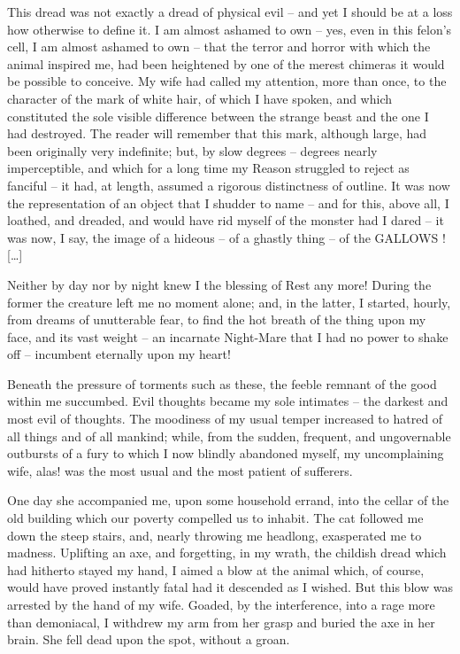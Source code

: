 \documentclass[11pt,a4paper]{article}
\begin{document}
This dread was not exactly a dread of physical evil -- and yet I should be at a loss how otherwise to define it. I am almost ashamed to own -- yes, even in this felon's cell, I am almost ashamed to own -- that the terror and horror with which the animal inspired me, had been heightened by one of the merest chimeras it would be possible to conceive. My wife had called my attention, more than once, to the character of the mark of white hair, of which I have spoken, and which constituted the sole visible difference between the strange beast and the one I had destroyed. The reader will remember that this mark, although large, had been originally very indefinite; but, by slow degrees -- degrees nearly imperceptible, and which for a long time my Reason struggled to reject as fanciful -- it had, at length, assumed a rigorous distinctness of outline. It was now the representation of an object that I shudder to name -- and for this, above all, I loathed, and dreaded, and would have rid myself of the monster had I dared -- it was now, I say, the image of a hideous -- of a ghastly thing -- of the GALLOWS ! […]

Neither by day nor by night knew I the blessing of Rest any more! During the former the creature left me no moment alone; and, in the latter, I started, hourly, from dreams of unutterable fear, to find the hot breath of the thing upon my face, and its vast weight -- an incarnate Night-Mare that I had no power to shake off -- incumbent eternally upon my heart!

Beneath the pressure of torments such as these, the feeble remnant of the good within me succumbed. Evil thoughts became my sole intimates -- the darkest and most evil of thoughts. The moodiness of my usual temper increased to hatred of all things and of all mankind; while, from the sudden, frequent, and ungovernable outbursts of a fury to which I now blindly abandoned myself, my uncomplaining wife, alas! was the most usual and the most patient of sufferers.

One day she accompanied me, upon some household errand, into the cellar of the old building which our poverty compelled us to inhabit. The cat followed me down the steep stairs, and, nearly throwing me headlong, exasperated me to madness. Uplifting an axe, and forgetting, in my wrath, the childish dread which had hitherto stayed my hand, I aimed a blow at the animal which, of course, would have proved instantly fatal had it descended as I wished. But this blow was arrested by the hand of my wife. Goaded, by the interference, into a rage more than demoniacal, I withdrew my arm from her grasp and buried the axe in her brain. She fell dead upon the spot, without a groan.
\end{document}
